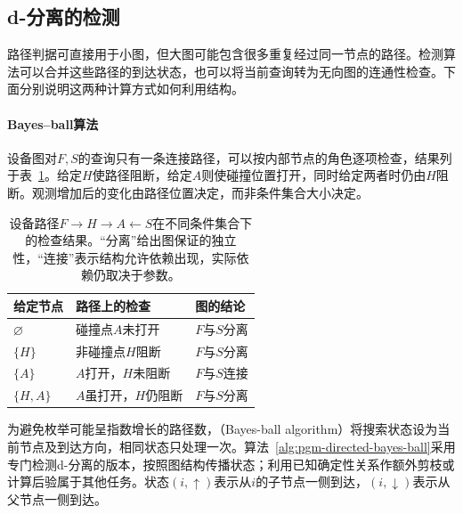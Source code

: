 \subsection{d-分离的检测}
\label{sec:pgm-directed-d-separation-testing}

路径判据可直接用于小图，但大图可能包含很多重复经过同一节点的路径。检测算法可以合并这些路径的到达状态，也可以将当前查询转为无向图的连通性检查。下面分别说明这两种计算方式如何利用结构。

\begingroup
\let\subsubsection\paragraph

\subsubsection{Bayes--ball算法}
\label{sec:pgm-directed-bayes-ball}

设备图对$F,S$的查询只有一条连接路径，可以按内部节点的角色逐项检查，结果列于表~\ref{tab:pgm-directed-path-tests}。给定$H$使路径阻断，给定$A$则使碰撞位置打开，同时给定两者时仍由$H$阻断。观测增加后的变化由路径位置决定，而非条件集合大小决定。

\begin{table}[htbp]
  \centering
  \begin{tabularx}{\linewidth}{@{}lXX@{}}
    \toprule
    给定节点 & 路径上的检查 & 图的结论 \\
    \midrule
    $\varnothing$ & 碰撞点$A$未打开 & $F$与$S$分离 \\
    $\{H\}$ & 非碰撞点$H$阻断 & $F$与$S$分离 \\
    $\{A\}$ & $A$打开，$H$未阻断 & $F$与$S$连接 \\
    $\{H,A\}$ & $A$虽打开，$H$仍阻断 & $F$与$S$分离 \\
    \bottomrule
  \end{tabularx}
  \caption{设备路径$F\to H\to A\leftarrow S$在不同条件集合下的检查结果。“分离”给出图保证的独立性，“连接”表示结构允许依赖出现，实际依赖仍取决于参数。}
  \label{tab:pgm-directed-path-tests}
\end{table}
\FloatBarrier

为避免枚举可能呈指数增长的路径数，（Bayes-ball algorithm）将搜索状态设为当前节点及到达方向，相同状态只处理一次。算法~\ref{alg:pgm-directed-bayes-ball}采用专门检测d-分离的版本，按照图结构传播状态；利用已知确定性关系作额外剪枝或计算后验属于其他任务。状态$(i,\uparrow)$表示从$i$的子节点一侧到达，$(i,\downarrow)$表示从父节点一侧到达。

